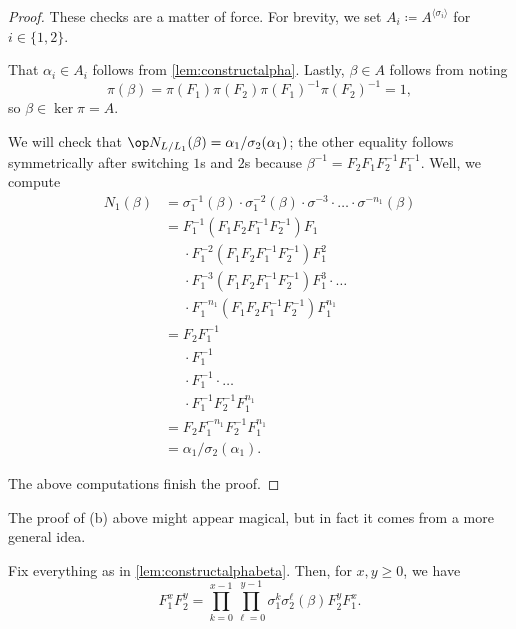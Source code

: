 \documentclass{article}
\numberwithin{equation}{section}
\begin{document}
\begin{proof}
	These checks are a matter of force. For brevity, we set $A_i\coloneqq A^{\langle\sigma_i\rangle}$ for $i\in\{1,2\}$.
	\begin{listalph}
		\item That $\alpha_i\in A_i$ follows from \autoref{lem:constructalpha}. Lastly, $\beta\in A$ follows from noting
		\[\pi(\beta)=\pi(F_1)\pi(F_2)\pi(F_1)^{-1}\pi(F_2)^{-1}=1,\]
		so $\beta\in\ker\pi=A$.
		\item We will check that $\op N_{L/L_1}(\beta)=\alpha_1/\sigma_2(\alpha_1)$; the other equality follows symmetrically after switching $1$s and $2$s because $\beta^{-1}=F_2F_1F_2^{-1}F_1^{-1}$. Well, we compute
		\begin{align*}
			N_1(\beta) &= \sigma_1^{-1}(\beta)\cdot\sigma_1^{-2}(\beta)\cdot\sigma^{-3}\cdot\ldots\cdot\sigma^{-n_1}(\beta) \\
			&= F_1^{-1}\left(F_1F_2F_1^{-1}F_2^{-1}\right)F_1 \\
			&\phantom{{}={}}\cdot F_1^{-2}\left(F_1F_2F_1^{-1}F_2^{-1}\right)F_1^2 \\
			&\phantom{{}={}}\cdot F_1^{-3}\left(F_1F_2F_1^{-1}F_2^{-1}\right)F_1^3\cdot\ldots \\
			&\phantom{{}={}}\cdot F_1^{-n_1}(F_1F_2F_1^{-1}F_2^{-1})F_1^{n_1} \\
			&= F_2F_1^{-1} \\
			&\phantom{{}={}}\cdot F_1^{-1} \\
			&\phantom{{}={}}\cdot F_1^{-1}\cdot\ldots \\
			&\phantom{{}={}}\cdot F_1^{-1}F_2^{-1}F_1^{n_1} \\
			&= F_2F_1^{-n_1}F_2^{-1}F_1^{n_1} \\
			&= \alpha_1/\sigma_2(\alpha_1).
		\end{align*}
	\end{listalph}
	The above computations finish the proof.
\end{proof}
The proof of (b) above might appear magical, but in fact it comes from a more general idea.
\begin{lemma} \label{lem:switchtwo}
	Fix everything as in \autoref{lem:constructalphabeta}. Then, for $x,y\ge0$, we have
	\[F_1^xF_2^y=\prod_{k=0}^{x-1}\prod_{\ell=0}^{y-1}\sigma_1^k\sigma_2^\ell(\beta)F_2^yF_1^x.\]
\end{lemma}
\end{document}
